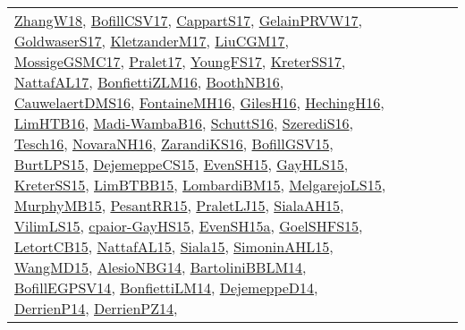 {\begin{longtable}{llp{6cm}p{6cm}p{6cm}}
\href{articles/ZhangW18.pdf}{ZhangW18}\cite{ZhangW18}, \href{papers/BofillCSV17.pdf}{BofillCSV17}\cite{BofillCSV17}, \href{papers/CappartS17.pdf}{CappartS17}\cite{CappartS17}, \href{papers/GelainPRVW17.pdf}{GelainPRVW17}\cite{GelainPRVW17}, \href{papers/GoldwaserS17.pdf}{GoldwaserS17}\cite{GoldwaserS17}, \href{papers/KletzanderM17.pdf}{KletzanderM17}\cite{KletzanderM17}, \href{papers/LiuCGM17.pdf}{LiuCGM17}\cite{LiuCGM17}, \href{papers/MossigeGSMC17.pdf}{MossigeGSMC17}\cite{MossigeGSMC17}, \href{papers/Pralet17.pdf}{Pralet17}\cite{Pralet17}, \href{papers/YoungFS17.pdf}{YoungFS17}\cite{YoungFS17}, \href{articles/KreterSS17.pdf}{KreterSS17}\cite{KreterSS17}, \href{articles/NattafAL17.pdf}{NattafAL17}\cite{NattafAL17}, \href{papers/BonfiettiZLM16.pdf}{BonfiettiZLM16}\cite{BonfiettiZLM16}, \href{papers/BoothNB16.pdf}{BoothNB16}\cite{BoothNB16}, \href{papers/CauwelaertDMS16.pdf}{CauwelaertDMS16}\cite{CauwelaertDMS16}, \href{papers/FontaineMH16.pdf}{FontaineMH16}\cite{FontaineMH16}, \href{papers/GilesH16.pdf}{GilesH16}\cite{GilesH16}, \href{papers/HechingH16.pdf}{HechingH16}\cite{HechingH16}, \href{papers/LimHTB16.pdf}{LimHTB16}\cite{LimHTB16}, \href{papers/Madi-WambaB16.pdf}{Madi-WambaB16}\cite{Madi-WambaB16}, \href{papers/SchuttS16.pdf}{SchuttS16}\cite{SchuttS16}, \href{papers/SzerediS16.pdf}{SzerediS16}\cite{SzerediS16}, \href{papers/Tesch16.pdf}{Tesch16}\cite{Tesch16}, \href{articles/NovaraNH16.pdf}{NovaraNH16}\cite{NovaraNH16}, \href{articles/ZarandiKS16.pdf}{ZarandiKS16}\cite{ZarandiKS16}, \href{papers/BofillGSV15.pdf}{BofillGSV15}\cite{BofillGSV15}, \href{papers/BurtLPS15.pdf}{BurtLPS15}\cite{BurtLPS15}, \href{papers/DejemeppeCS15.pdf}{DejemeppeCS15}\cite{DejemeppeCS15}, \href{papers/EvenSH15.pdf}{EvenSH15}\cite{EvenSH15}, \href{papers/GayHLS15.pdf}{GayHLS15}\cite{GayHLS15}, \href{papers/KreterSS15.pdf}{KreterSS15}\cite{KreterSS15}, \href{papers/LimBTBB15.pdf}{LimBTBB15}\cite{LimBTBB15}, \href{papers/LombardiBM15.pdf}{LombardiBM15}\cite{LombardiBM15}, \href{papers/MelgarejoLS15.pdf}{MelgarejoLS15}\cite{MelgarejoLS15}, \href{papers/MurphyMB15.pdf}{MurphyMB15}\cite{MurphyMB15}, \href{papers/PesantRR15.pdf}{PesantRR15}\cite{PesantRR15}, \href{papers/PraletLJ15.pdf}{PraletLJ15}\cite{PraletLJ15}, \href{papers/SialaAH15.pdf}{SialaAH15}\cite{SialaAH15}, \href{papers/VilimLS15.pdf}{VilimLS15}\cite{VilimLS15}, \href{papers/cpaior-GayHS15.pdf}{cpaior-GayHS15}\cite{cpaior-GayHS15}, \href{articles/EvenSH15a.pdf}{EvenSH15a}\cite{EvenSH15a}, \href{articles/GoelSHFS15.pdf}{GoelSHFS15}\cite{GoelSHFS15}, \href{articles/LetortCB15.pdf}{LetortCB15}\cite{LetortCB15}, \href{articles/NattafAL15.pdf}{NattafAL15}\cite{NattafAL15}, \href{articles/Siala15.pdf}{Siala15}\cite{Siala15}, \href{articles/SimoninAHL15.pdf}{SimoninAHL15}\cite{SimoninAHL15}, \href{articles/WangMD15.pdf}{WangMD15}\cite{WangMD15}, \href{papers/AlesioNBG14.pdf}{AlesioNBG14}\cite{AlesioNBG14}, \href{papers/BartoliniBBLM14.pdf}{BartoliniBBLM14}\cite{BartoliniBBLM14}, \href{papers/BofillEGPSV14.pdf}{BofillEGPSV14}\cite{BofillEGPSV14}, \href{papers/BonfiettiLM14.pdf}{BonfiettiLM14}\cite{BonfiettiLM14}, \href{papers/DejemeppeD14.pdf}{DejemeppeD14}\cite{DejemeppeD14}, \href{papers/DerrienP14.pdf}{DerrienP14}\cite{DerrienP14}, \href{papers/DerrienPZ14.pdf}{DerrienPZ14}\cite{DerrienPZ14}, 
\end{longtable}}
